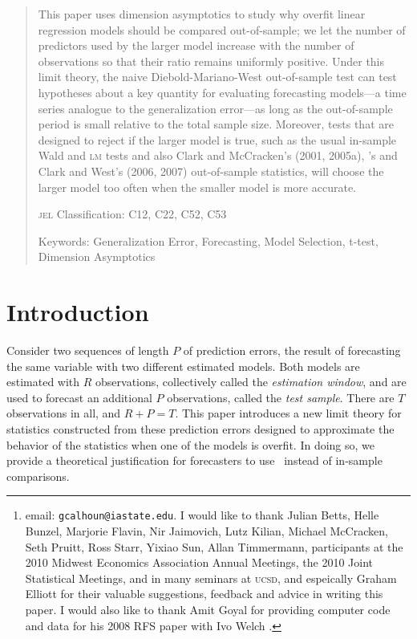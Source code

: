 \documentclass[11pt]{article}
\author{Gray Calhoun\thanks{email: \texttt{gcalhoun@iastate.edu}. I
    would like to thank Julian Betts, Helle Bunzel, Marjorie Flavin,
    Nir Jaimovich, Lutz Kilian, Michael McCracken, Seth Pruitt, Ross
    Starr, Yixiao Sun, Allan Timmermann, participants at the 2010
    Midwest Economics Association Annual Meetings, the 2010 Joint
    Statistical Meetings, and in many seminars at \textsc{ucsd}, and
    espeically Graham Elliott for their valuable suggestions, feedback
    and advice in writing this paper.  I would also like to thank Amit
    Goyal for providing computer code and data for his 2008 RFS paper
    with Ivo Welch \citep{GoW:08}.} \\ Iowa State University,
  Economics Department}
\date{October 24, 2011}
\newcommand{\citepos}[1]{\citeauthor{#1}'s \citeyearpar{#1}}
\begin{document}
\maketitle

\begin{abstract}\thispagestyle{empty}\noindent
  This paper uses dimension asymptotics to study why overfit linear
  regression models should be compared out-of-sample; we let the
  number of predictors used by the larger model increase with the
  number of observations so that their ratio remains uniformly
  positive.  Under this limit theory, the naive Diebold-Mariano-West
  out-of-sample test can test hypotheses about a key quantity for
  evaluating forecasting models---a time series analogue to the
  generalization error---as long as the out-of-sample period is small
  relative to the total sample size.  Moreover, tests that are
  designed to reject if the larger model is true, such as the usual
  in-sample Wald and \textsc{lm} tests and also Clark and McCracken's
  (2001, 2005a), \citepos{Mcc:07} and Clark and West's (2006, 2007)
  out-of-sample statistics, will choose the larger model too often
  when the smaller model is more accurate.

\noindent \textsc{jel} Classification: C12, C22, C52, C53

\noindent Keywords: Generalization Error, Forecasting, Model
Selection, t-test, Dimension Asymptotics
\end{abstract}

\section{Introduction}\label{sec:introduction}
Consider two sequences of length $P$ of prediction errors, the result
of forecasting the same variable with two different estimated models.
Both models are estimated with $R$ observations, collectively called
the {\em estimation window}, and are used to forecast an additional
$P$ observations, called the {\em test sample}.  There are $T$
observations in all, and $R+P=T$.  This paper introduces a new limit
theory for statistics constructed from these prediction errors
designed to approximate the behavior of the statistics when one of the
models is overfit.  In doing so, we provide a theoretical
justification for forecasters to use \oos\ instead of
in-sample comparisons.
\end{document}
